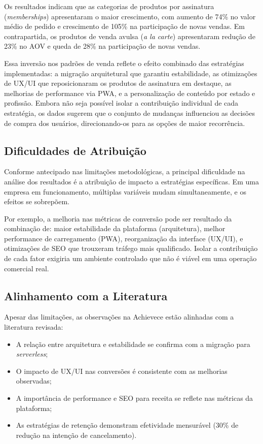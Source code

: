 Os resultados indicam que as categorias de produtos por assinatura (\textit{memberships}) apresentaram o maior crescimento, com aumento de 74\% no valor médio de pedido e crescimento de 105\% na participação de novas vendas. Em contrapartida, os produtos de venda avulsa (\textit{a la carte}) apresentaram redução de 23\% no AOV e queda de 28\% na participação de novas vendas.

Essa inversão nos padrões de venda reflete o efeito combinado das estratégias implementadas: a migração arquitetural que garantiu estabilidade, as otimizações de UX/UI que reposicionaram os produtos de assinatura em destaque, as melhorias de performance via PWA, e a personalização de conteúdo por estado e profissão. Embora não seja possível isolar a contribuição individual de cada estratégia, os dados sugerem que o conjunto de mudanças influenciou as decisões de compra dos usuários, direcionando-os para as opções de maior recorrência.

\subsection{Dificuldades de Atribuição}

Conforme antecipado nas limitações metodológicas, a principal dificuldade na análise dos resultados é a atribuição de impacto a estratégias específicas. Em uma empresa em funcionamento, múltiplas variáveis mudam simultaneamente, e os efeitos se sobrepõem.

Por exemplo, a melhoria nas métricas de conversão pode ser resultado da combinação de: maior estabilidade da plataforma (arquitetura), melhor performance de carregamento (PWA), reorganização da interface (UX/UI), e otimizações de SEO que trouxeram tráfego mais qualificado. Isolar a contribuição de cada fator exigiria um ambiente controlado que não é viável em uma operação comercial real.

\subsection{Alinhamento com a Literatura}

Apesar das limitações, as observações na Achievece estão alinhadas com a literatura revisada:

\begin{itemize}
    \item A relação entre arquitetura e estabilidade \cite{ubur_reviewing_2023} se confirma com a migração para \textit{serverless};
    \item O impacto de UX/UI nas conversões \cite{nawir_impact_2024} é consistente com as melhorias observadas;
    \item A importância de performance e SEO para receita \cite{bansal_seo_2024} se reflete nas métricas da plataforma;
    \item As estratégias de retenção demonstram efetividade mensurável (30\% de redução na intenção de cancelamento).
\end{itemize}

